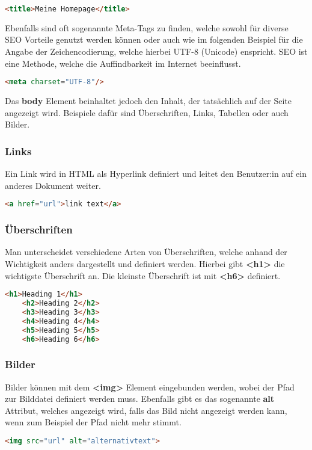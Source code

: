 \begin{lstlisting}[language=html]
    <title>Meine Homepage</title>
\end{lstlisting}

Ebenfalls sind oft sogenannte Meta-Tags zu finden, welche sowohl für diverse SEO Vorteile genutzt werden können oder auch wie im folgenden Beispiel für die Angabe der Zeichencodierung, welche hierbei UTF-8 (Unicode) enspricht.
SEO ist eine Methode, welche die Auffindbarkeit im Internet beeinflusst.

\begin{lstlisting}[language=html]
    <meta charset="UTF-8"/>
\end{lstlisting}

Das \textbf{body} Element beinhaltet jedoch den Inhalt, der tatsächlich auf der Seite angezeigt wird. Beispiele dafür sind Überschriften, Links, Tabellen oder auch Bilder.

\cite{frontend_web_html}

\subsubsection{Links}
Ein Link wird in HTML als Hyperlink definiert und leitet den Benutzer:in auf ein anderes Dokument weiter.

\begin{lstlisting}[language=html]
    <a href="url">link text</a>
\end{lstlisting}

\cite{frontend_web_html_links}

\subsubsection{Überschriften}
Man unterscheidet verschiedene Arten von Überschriften, welche anhand der Wichtigkeit anders dargestellt und definiert werden. Hierbei gibt \textbf{<h1>} die wichtigste Überschrift an. Die kleinste Überschrift ist mit \textbf{<h6>} definiert.

\begin{lstlisting}[language=html, caption=HTML Headings]
    <h1>Heading 1</h1>
    <h2>Heading 2</h2>
    <h3>Heading 3</h3>
    <h4>Heading 4</h4>
    <h5>Heading 5</h5>
    <h6>Heading 6</h6>
\end{lstlisting}

\cite{frontend_web_html_überschriften}

\newpage
\subsubsection{Bilder}
Bilder können mit dem \textbf{<img>} Element eingebunden werden, wobei der Pfad zur Bilddatei definiert werden muss. Ebenfalls gibt es das sogenannte \textbf{alt} Attribut, welches angezeigt wird, falls das Bild nicht angezeigt werden kann, wenn zum Beispiel der Pfad nicht mehr stimmt.

\begin{lstlisting}[language=html]
    <img src="url" alt="alternativtext">
\end{lstlisting}




